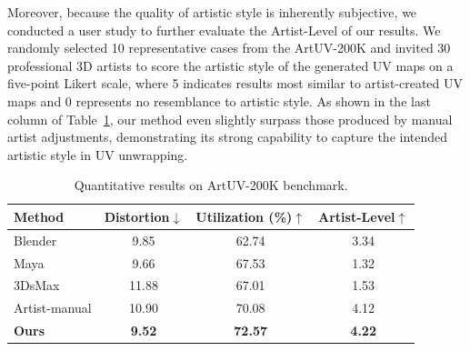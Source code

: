 \documentclass{article}
\begin{document}
Moreover, because the quality of artistic style is inherently subjective, we conducted a user study to further evaluate the Artist-Level of our results. We randomly selected 10 representative cases from the ArtUV-200K and invited 30 professional 3D artists to score the artistic style of the generated UV maps on a five-point Likert scale, where 5 indicates results most similar to artist-created UV maps and 0 represents no resemblance to artistic style. As shown in the last column of Table~\ref{tab:artuv-bench}, our method even slightly surpass those produced by manual artist adjustments, demonstrating its strong capability to capture the intended artistic style in UV unwrapping.
\begin{table}[htb]
\centering
\begin{tabular}{lccc}
\toprule
Method & Distortion$\downarrow$ & Utilization (\%)$\uparrow$ & Artist-Level$\uparrow$ \\ 
\midrule
Blender & 9.85 & 62.74 & 3.34  \\ 
Maya & 9.66  & 67.53 &  1.32 \\
3DsMax & 11.88  & 67.01 & 1.53 \\
Artist-manual & 10.90 & 70.08 & 4.12 \\
\textbf{Ours} & \textbf{9.52}  & \textbf{72.57} & \textbf{4.22} \\
\bottomrule
\end{tabular}
\caption{Quantitative results on ArtUV-200K benchmark.}
\label{tab:artuv-bench}
\end{table}
\end{document}
